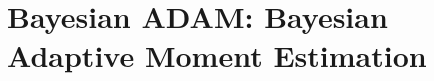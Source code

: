 



\section{Bayesian ADAM: Bayesian Adaptive Moment Estimation}

\cite{khan2017variational, zhang2018noisy, miani2022laplacian}
